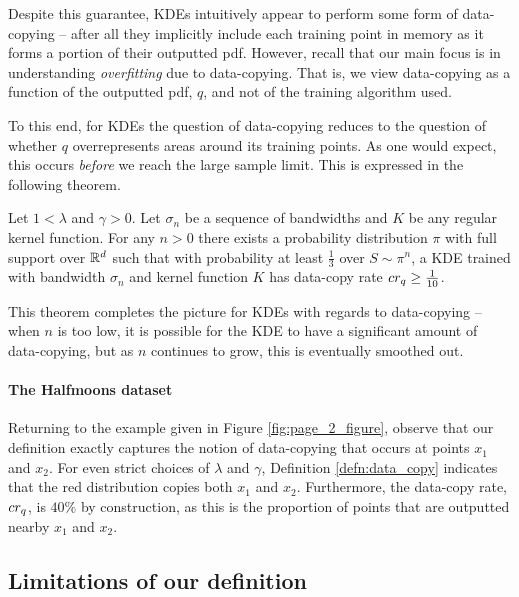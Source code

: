 Despite this guarantee, KDEs intuitively appear to perform some form of data-copying -- after all they implicitly include each training point in memory as it forms a portion of their outputted pdf. However, recall that our main focus is in understanding \textit{overfitting} due to data-copying. That is, we view data-copying as a function of the outputted pdf, $q$, and not of the training algorithm used. 

To this end, for KDEs the question of data-copying reduces to the question of whether $q$ overrepresents areas around its training points. As one would expect, this occurs \textit{before} we reach the large sample limit. This is expressed in the following theorem.

\begin{theorem}\label{thm:KDE}
Let $1 < \lambda$ and $\gamma > 0$. Let $\sigma_n$ be a sequence of bandwidths and $K$ be any regular kernel function. For any $n > 0$ there exists a probability distribution $\pi$ with full support over $\mathbb{R}^d$ such that with probability at least $\frac{1}{3}$ over $S \sim \pi^n$, a KDE trained with bandwidth $\sigma_n$ and kernel function $K$ has data-copy rate $cr_q \geq \frac{1}{10}$.
\end{theorem}

This theorem completes the picture for KDEs with regards to data-copying -- when $n$ is too low, it is possible for the KDE to have a significant amount of data-copying, but as $n$ continues to grow, this is eventually smoothed out.

\paragraph{The Halfmoons dataset}

Returning to the example given in Figure \ref{fig:page_2_figure}, observe that our definition exactly captures the notion of data-copying that occurs at points $x_1$ and $x_2$. For even strict choices of $\lambda$ and $\gamma$, Definition \ref{defn:data_copy} indicates that the red distribution copies both $x_1$ and $x_2$. Furthermore, the data-copy rate, $cr_q$, is $40\%$ by construction, as this is the proportion of points that are outputted nearby $x_1$ and $x_2$.

\subsection{Limitations of our definition}\label{sec:limitations}

